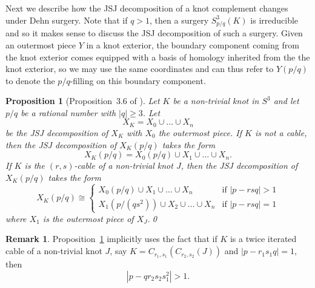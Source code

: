 \documentclass{amsart} %
\theoremstyle{thm}
\newtheorem{prop}[Theorem]{Proposition}
\theoremstyle{definition}
\newtheorem{rem}[Theorem]{Remark}
\numberwithin{equation}{section}
\begin{document}
Next we describe how the JSJ decomposition of a knot complement changes under Dehn surgery. Note that if $q>1$, then a surgery $S_{p/q}^3(K)$ is irreducible \cite{Gordon1987reducible} and so it makes sense to discuss the JSJ decomposition of such a surgery. Given an outermost piece $Y$ in a knot exterior, the boundary component coming from the knot exterior comes equipped with a basis of homology inherited from the the knot exterior, so we may use the same coordinates and can thus refer to $Y(p/q)$ to denote the $p/q$-filling on this boundary component.
\begin{prop}[Proposition~3.6 of \cite{Sorya2023satellite}]\label{prop:surgery_JSJ_decomp}
    Let $K$ be a non-trivial knot in $S^3$ and let $p/q$ be a rational number with $|q|\geq 3$. Let
    \[X_K=X_0 \cup \dots \cup X_n\]
    be the JSJ decomposition of $X_K$ with $X_0$ the outermost piece. If $K$ is not a cable, then the JSJ decomposition of $X_K(p/q)$ takes the form
    \[
    X_K(p/q)=X_0(p/q)\cup X_1 \cup \dots \cup X_n.
    \]
    If $K$ is the $(r,s)$-cable of a non-trivial knot $J$, then the JSJ decomposition of $X_K(p/q)$ takes the form
    \[
    X_K(p/q)\cong \begin{cases}
        X_0(p/q)\cup X_1 \cup \dots \cup X_n &\text{if $|p-rsq|>1$}\\
        X_1(p/(qs^2))\cup X_2 \cup \dots \cup X_n &\text{if $|p-rsq|=1$}
    \end{cases}
    \]
    where $X_1$ is the outermost piece of $X_J$.\qed
\end{prop}
\begin{rem}\label{rem:only_collapsing_once}
Proposition~\ref{prop:surgery_JSJ_decomp} implicitly uses the fact that if $K$ is a twice iterated cable of a non-trivial knot $J$, say $K=C_{r_1,s_1}(C_{r_2,s_2}(J))$ and $|p-r_1s_1q|=1$, then 
\[
|p-qr_2s_2s_1^2|>1.
\]
\end{rem}
\end{document}
